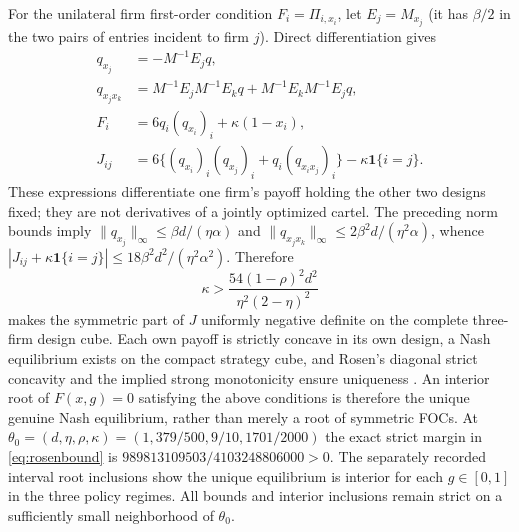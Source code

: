 For the unilateral firm first-order condition $F_i=\Pi_{i,x_i}$, let $E_j=M_{x_j}$ (it has $\beta/2$ in the two pairs of entries incident to firm $j$). Direct differentiation gives
\begin{align}\label{eq:appendixF}
q_{x_j}&=-M^{-1}E_jq,\\
q_{x_jx_k}&=M^{-1}E_jM^{-1}E_kq+M^{-1}E_kM^{-1}E_jq,\nonumber\\
F_i&=6q_i(q_{x_i})_i+\kappa(1-x_i),\nonumber\\
J_{ij}&=6\{(q_{x_i})_i(q_{x_j})_i+q_i(q_{x_ix_j})_i\}-\kappa\mathbf1\{i=j\}.\nonumber
\end{align}
These expressions differentiate one firm's payoff holding the other two designs fixed; they are not derivatives of a jointly optimized cartel. The preceding norm bounds imply $\|q_{x_j}\|_\infty\le\beta d/(\eta\alpha)$ and $\|q_{x_jx_k}\|_\infty\le2\beta^2d/(\eta^2\alpha)$, whence $|J_{ij}+\kappa\mathbf1\{i=j\}|\le18\beta^2d^2/(\eta^2\alpha^2)$. Therefore
\begin{equation}\label{eq:rosenbound}
\boxed{\ \kappa>\frac{54(1-\rho)^2d^2}{\eta^2(2-\eta)^2}\ }
\end{equation}
makes the symmetric part of $J$ uniformly negative definite on the complete three-firm design cube. Each own payoff is strictly concave in its own design, a Nash equilibrium exists on the compact strategy cube, and Rosen's diagonal strict concavity and the implied strong monotonicity ensure uniqueness \citep{Rosen1965}. An interior root of $F(x,g)=0$ satisfying the above conditions is therefore the unique genuine Nash equilibrium, rather than merely a root of symmetric FOCs. At $\theta_0=(d,\eta,\rho,\kappa)=(1,379/500,9/10,1701/2000)$ the exact strict margin in \eqref{eq:rosenbound} is $989813109503/4103248806000>0$. The separately recorded interval root inclusions show the unique equilibrium is interior for each $g\in[0,1]$ in the three policy regimes. All bounds and interior inclusions remain strict on a sufficiently small neighborhood of $\theta_0$.


